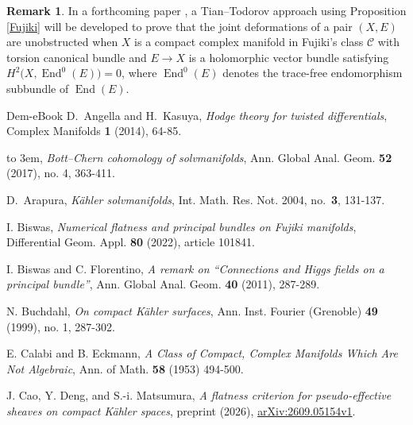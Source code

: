 \documentclass[11pt]{amsart}
\numberwithin{equation}{section}
\theoremstyle{definition}
\theoremstyle{plain}
\theoremstyle{plain}
\theoremstyle{definition}
\newtheorem{remark}  [theorem]     {Remark}
\theoremstyle{stepstyle}
\begin{document}
	
	\begin{remark}
		In a forthcoming paper \cite{Zha}, a Tian--Todorov approach
		using Proposition \ref{Fujiki} will be developed to prove that the joint
		deformations of a pair $(X,E)$ are unobstructed when $X$ is a compact
		complex manifold in Fujiki's class $\mathcal C$ with torsion canonical
		bundle and $E\to X$ is a holomorphic vector bundle satisfying
		$H^2\bigl(X,\operatorname{End}^0(E)\bigr)=0$, where
		$\operatorname{End}^0(E)$ denotes the trace-free endomorphism subbundle
		of $\operatorname{End}(E)$.
	\end{remark}
	
	
	
	
	
	
	\begin{thebibliography}{Dem-eBook}
		D.~Angella and H.~Kasuya,
		\textit{Hodge theory for twisted differentials},
		Complex Manifolds \textbf{1} (2014), 64-85.
		
		\leavevmode\hbox to 3em{\hrulefill},
		\newblock \textit{Bott--Chern cohomology of solvmanifolds},
		\newblock Ann. Global Anal. Geom. \textbf{52} (2017), no. 4, 363-411.
		
		D.~Arapura,
		\textit{K\"ahler solvmanifolds},
		Int. Math. Res. Not. 2004, no.~\textbf{3}, 131-137.
		
		I. Biswas,
		\newblock \textit{Numerical flatness and principal bundles on Fujiki manifolds},
		\newblock Differential Geom. Appl. \textbf{80} (2022), article 101841.
		
		I. Biswas and C. Florentino,
		\newblock \textit{A remark on ``Connections and Higgs fields on a principal bundle''},
		\newblock Ann. Global Anal. Geom. \textbf{40} (2011), 287-289.
		
		
		N.  Buchdahl,
		\textit{On compact K\"ahler surfaces},
		Ann. Inst. Fourier (Grenoble) \textbf{49} (1999), no.  1, 287-302.
		
		E. Calabi and  B. Eckmann, \textit{A Class of Compact, Complex Manifolds Which Are Not Algebraic}, Ann.
		of Math. \textbf{58} (1953) 494-500.
		
		J. Cao, Y. Deng, and S.-i. Matsumura,
		\newblock \textit{A flatness criterion for pseudo-effective sheaves on compact K\"ahler spaces},
		\newblock preprint (2026),
		\href{https://arxiv.org/abs/2609.05154v1}{arXiv:2609.05154v1}.
		

\end{thebibliography}
\end{document}
